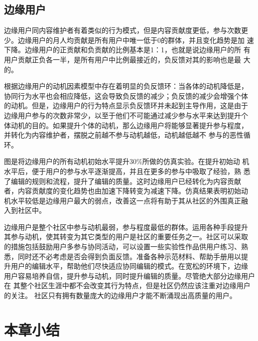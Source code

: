 \subsection{边缘用户}
边缘用户同内容维护者有着类似的行为模式，但是内容贡献度更低，参与次数更
少。边缘用户的月人均贡献是所有用户中唯一低于0的群体，并且变化趋势是加
速下降。边缘用户的正贡献和负贡献的比例基本是1：1，也就是说边缘用户的所
有用户贡献正负各一半，是所有用户中比例最接近的，负反馈对其的影响也是最
大的。

根据边缘用户的动机因素模型中存在着明显的负反馈环：当各体的动机降低是，
协同行为水平也会相应降低，这会导致负反馈的减少；负反馈的减少会增强个体
的动机。但是，边缘用户的行为特点显示负反馈环并未起到主导作用，这是由于
边缘用户参与的次数非常少，以至于他们不可能通过减少参与水平来达到提升个
体动机的目的。如果提升个体的动机，那么边缘用户将能够显著提升参与程度，
并转化为内容维护者，摆脱之前越不参与动机越低，动机越低越不
参与的恶性循环。

图是将边缘用户的所有动机初始水平提升$30\%$所做的仿真实验。在提升初始动
机水平后，便于用户的参与水平逐渐提高，并且在更多的参与中吸取了经验，熟
悉了编辑的规则和流程，提升了编辑的质量。这时边缘用户已经转化为内容贡献
者，内容贡献度的变化趋势也由加速下降转变为减速下降。仿真结果表明初始动
机水平较低是边缘用户最大的弱点，改善这一点将有助于其从社区的外围真正融
入到社区中。

边缘用户是整个社区中参与动机最弱，参与程度最低的群体。运用各种手段提升
其参与动机，使其转变为其它类型的用户是社区的重要任务之一。社区可以采取
的措施包括鼓励用户多参与协同活动，可以设置一些实验性作品供用户练习、熟
悉，同时还不必考虑是否会得到负面反馈。准备各种示范材料、帮助手册用以提
升用户的编辑水平，帮助他们尽快适应协同编辑的模式。在宽松的环境下，边缘
用户容易培养自信，提升参与动机，同时提升编辑的质量。尽管绝大部分边缘用户在
其整个社区生涯中都不会改变其行为特点，但是社区仍然应该注重对边缘用户的关注。
社区只有拥有数量庞大的边缘用户才能不断涌现出高质量的用户。

\section{本章小结}





